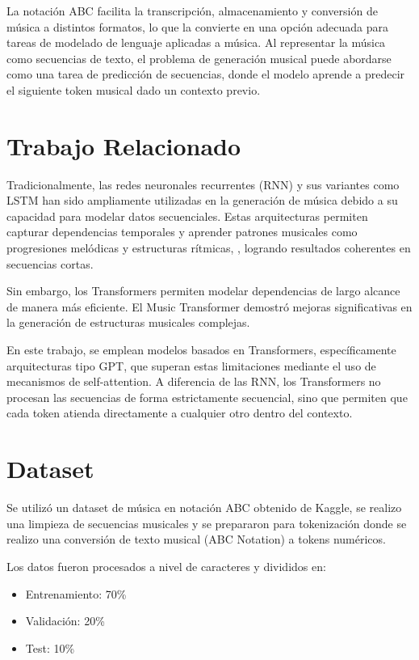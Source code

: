 \documentclass[conference]{IEEEtran}
\begin{document}
La notación ABC facilita la transcripción, almacenamiento y conversión de música a distintos formatos, lo que la convierte en una opción adecuada para tareas de modelado de lenguaje aplicadas a música. Al representar la música como secuencias de texto, el problema de generación musical puede abordarse como una tarea de predicción de secuencias, donde el modelo aprende a predecir el siguiente token musical dado un contexto previo.

\section{Trabajo Relacionado}

Tradicionalmente, las redes neuronales recurrentes (RNN) y sus variantes como LSTM han sido ampliamente utilizadas en la generación de música debido a su capacidad para modelar datos secuenciales. Estas arquitecturas permiten capturar dependencias temporales y aprender patrones musicales como progresiones melódicas y estructuras rítmicas, \cite{boulanger2012modeling}, logrando resultados coherentes en secuencias cortas.

Sin embargo, los Transformers permiten modelar dependencias de largo alcance de manera más eficiente. El Music Transformer \cite{huang2018music} demostró mejoras significativas en la generación de estructuras musicales complejas.

En este trabajo, se emplean modelos basados en Transformers, específicamente arquitecturas tipo GPT, que superan estas limitaciones mediante el uso de mecanismos de self-attention. A diferencia de las RNN, los Transformers no procesan las secuencias de forma estrictamente secuencial, sino que permiten que cada token atienda directamente a cualquier otro dentro del contexto.

\section{Dataset}

Se utilizó un dataset de música en notación ABC obtenido de Kaggle, se realizo una limpieza de secuencias musicales y se prepararon para tokenización donde se realizo una conversión de texto musical (ABC Notation) a tokens numéricos.

Los datos fueron procesados a nivel de caracteres y divididos en:

\begin{itemize}
\item Entrenamiento: 70\%
\item Validación: 20\%
\item Test: 10\%
\end{itemize}
\end{document}
